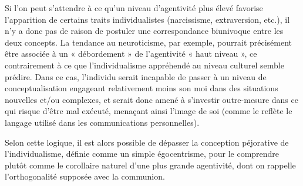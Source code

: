 Si l'on peut s'attendre à ce qu'un niveau d'agentivité plus élevé favorise l'apparition de certains traits individualistes (narcissisme, extraversion, etc.), il n'y a donc pas de raison de postuler une correspondance biunivoque entre les deux concepts. La tendance au neuroticisme, par exemple, pourrait précisément être associée à un « débordement » de l'agentivité « haut niveau », ce contrairement à ce que l'individualisme appréhendé au niveau culturel semble prédire. Dans ce cas, l'individu serait incapable de passer à un niveau de conceptualisation engageant relativement moins son moi dans des situations nouvelles et/ou complexes, et serait donc amené à s’investir outre-mesure dans ce qui risque d'être mal exécuté, menaçant ainsi l'image de soi (comme le reflète le langage utilisé dans les communications personnelles).

Selon cette logique, il est alors possible de dépasser la conception péjorative de l'individualisme, définie comme un simple égocentrisme, pour le comprendre plutôt comme le corollaire naturel d'une plus grande agentivité, dont on rappelle l’orthogonalité supposée avec la communion.